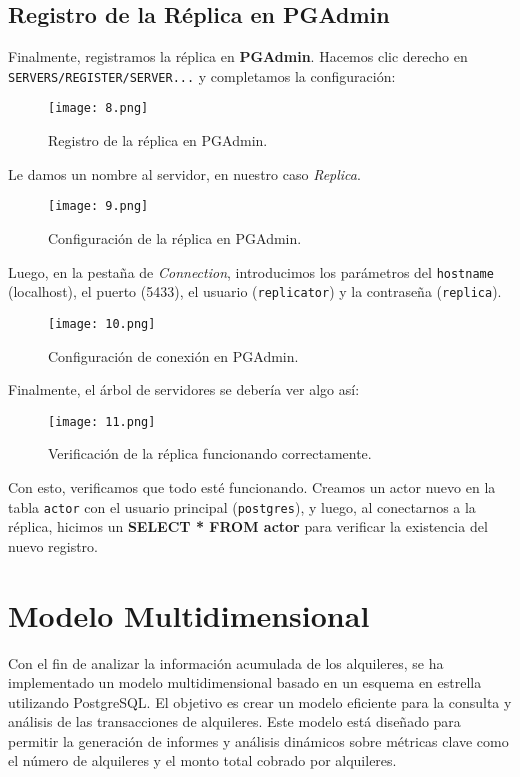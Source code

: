 \documentclass{article}
\begin{document}
\newpage
\subsection{Registro de la Réplica en PGAdmin}

Finalmente, registramos la réplica en \textbf{PGAdmin}. Hacemos clic derecho en \texttt{SERVERS/REGISTER/SERVER...} y completamos la configuración:

\begin{figure}[h]
    \centering
    \texttt{[image: 8.png]}
    \caption{Registro de la réplica en PGAdmin.}
\end{figure}

Le damos un nombre al servidor, en nuestro caso \textit{Replica}.

\begin{figure}[h]
    \centering
    \texttt{[image: 9.png]}
    \caption{Configuración de la réplica en PGAdmin.}
\end{figure}

\newpage
Luego, en la pestaña de \textit{Connection}, introducimos los parámetros del \texttt{hostname} (localhost), el puerto (5433), el usuario (\texttt{replicator}) y la contraseña (\texttt{replica}).

\begin{figure}[h]
    \centering
    \texttt{[image: 10.png]}
    \caption{Configuración de conexión en PGAdmin.}
\end{figure}

Finalmente, el árbol de servidores se debería ver algo así:

\begin{figure}[h]
    \centering
    \texttt{[image: 11.png]}
    \caption{Verificación de la réplica funcionando correctamente.}
\end{figure}

Con esto, verificamos que todo esté funcionando. Creamos un actor nuevo en la tabla \texttt{actor} con el usuario principal (\texttt{postgres}), y luego, al conectarnos a la réplica, hicimos un \textbf{SELECT * FROM actor} para verificar la existencia del nuevo registro.

\section{Modelo Multidimensional}

Con el fin de analizar la información acumulada de los alquileres, se ha implementado un modelo multidimensional basado en un esquema en estrella utilizando PostgreSQL. El objetivo es crear un modelo eficiente para la consulta y análisis de las transacciones de alquileres. Este modelo está diseñado para permitir la generación de informes y análisis dinámicos sobre métricas clave como el número de alquileres y el monto total cobrado por alquileres.
\end{document}
